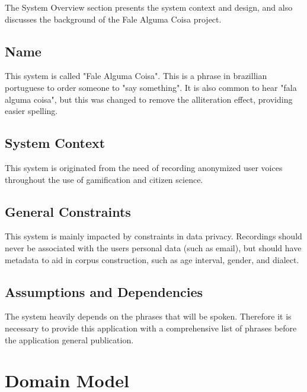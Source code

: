 The System Overview section presents the system context and design, and also discusses the background of the Fale Alguma Coisa project.

\subsection{Name}

This system is called "Fale Alguma Coisa". This is a phrase in brazillian portuguese to order someone to "say something". It is also common to hear "fala alguma coisa", but this was changed to remove the alliteration effect, providing easier spelling.

\subsection{System Context}

This system is originated from the need of recording anonymized user voices throughout the use of gamification and citizen science.

\subsection{General Constraints}

This system is mainly impacted by constraints in data privacy. Recordings should never be associated with the users personal data (such as email), but should have metadata to aid in corpus construction, such as age interval, gender, and dialect.

\subsection{Assumptions and Dependencies}

The system heavily depends on the phrases that will be spoken. Therefore it is necessary to provide this application with a comprehensive list of phrases before the application general publication.

\section{Domain Model}


